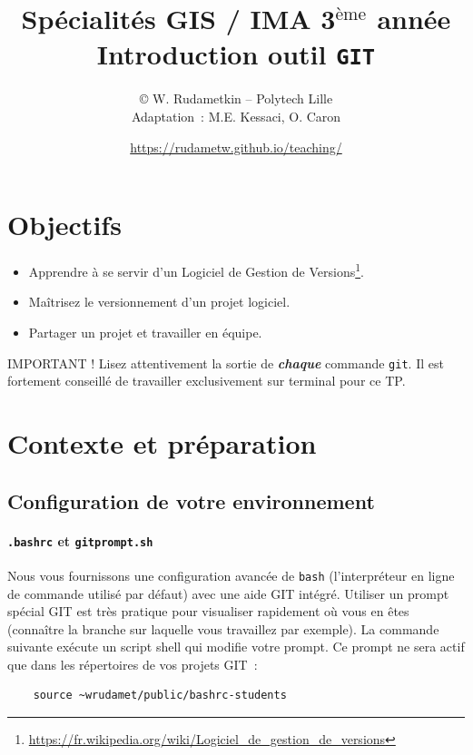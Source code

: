 \documentclass[final, a4paper, openbib, ]{article}
\title{Spécialités GIS / IMA 3$^{\mbox{\`eme}}$ année\\
\huge \textbf{Introduction outil \texttt{GIT}
}}
\author{\copyright{} W. Rudametkin -- Polytech Lille\\
	Adaptation~: M.E. Kessaci, O. Caron}
\date{\Large \url{https://rudametw.github.io/teaching/}}%
\begin{document}
\vspace{-5cm}
\posttitle{\par\end{center}}
\setlength{\droptitle}{-45pt}
\maketitle

\vspace{-1.2cm}
\section{Objectifs}\label{objectifs}

\begin{itemize}
\item Apprendre à se servir d'un Logiciel de Gestion de Versions\footnote{\url{https://fr.wikipedia.org/wiki/Logiciel_de_gestion_de_versions}}.
\item Maîtrisez le versionnement d'un projet logiciel.
\item Partager un projet et travailler en équipe.
\end{itemize}

\begin{alertinfo}{IMPORTANT !}
Lisez attentivement la sortie de \textbf{\textit{chaque}} commande \texttt{git}.
Il est fortement conseillé de travailler exclusivement sur terminal pour ce TP.
\end{alertinfo}

\section{Contexte et préparation}
\label{context} 

\subsection{Configuration de votre environnement}

\paragraph{\texttt{.bashrc} et \texttt{gitprompt.sh}}
Nous vous fournissons une configuration avancée de \texttt{bash} (l'interpréteur en ligne de commande utilisé par défaut) avec une aide GIT intégré.
Utiliser un prompt spécial GIT est très pratique pour visualiser rapidement où vous en êtes (connaître la branche sur laquelle vous travaillez par exemple). La commande suivante exécute un script shell qui modifie votre prompt. Ce prompt ne sera actif que dans les répertoires de vos projets GIT~: 
\begin{verbatim}
	source ~wrudamet/public/bashrc-students
\end{verbatim}
\end{document}
